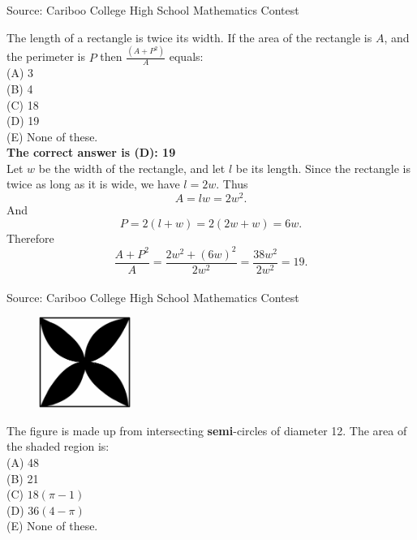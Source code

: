 \documentclass{article}
\begin{document}
\scriptsize
Source: Cariboo College High School Mathematics Contest

\normalsize
The length of a rectangle is twice its width. If the area of the rectangle is $A$, and the perimeter is $P$ then $\frac{(A+P^{2})}{A}$ equals:\\
(A) 3\\
(B) 4\\
(C) 18\\
(D) 19\\
(E) None of these.\\


\textbf{The correct answer is (D): 19}\\[1ex]
Let $w$ be the width of the rectangle, and let $l$ be its length. Since the rectangle is twice as long as it is wide, we have $l=2w$. Thus
\begin{equation*}
A=lw=2w^2.
\end{equation*}
And
\begin{equation*}
P=2(l+w)=2(2w+w)=6w.
\end{equation*}
Therefore
\begin{equation*}
\frac{A+P^{2}}{A}=\frac{2w^{2}+(6w)^{2}}{2w^{2}}=\frac{38w^{2}}{2w^{2}}=19.
\end{equation*}
\\[5 ex]

\scriptsize
Source: Cariboo College High School Mathematics Contest

\normalsize
\begin{figure}
	\includegraphics[width=30mm,viewport=36 122 514 596]{CCJPR74-8pic.eps}
\end{figure}
The figure is made up from intersecting \textbf{semi}-circles of diameter 12. The area of the shaded region is:\\
(A) 48\\
(B) 21\\
(C) $18(\pi-1)$\\
(D) $36(4-\pi)$\\
(E) None of these.\\
\end{document}
